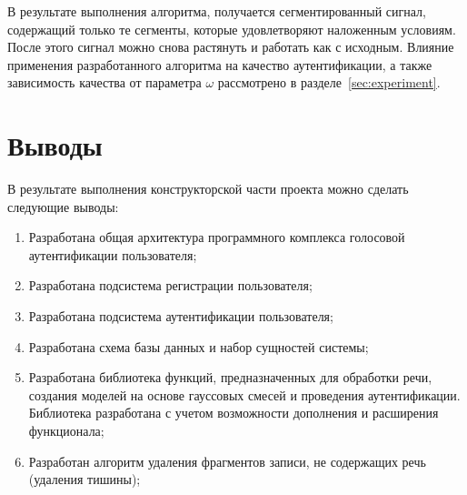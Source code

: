 В результате выполнения алгоритма, получается сегментированный сигнал, содержащий только те сегменты, которые удовлетворяют наложенным условиям. После этого сигнал можно снова растянуть и работать как с исходным. Влияние применения разработанного алгоритма на качество аутентификации, а также зависимость качества от параметра $\omega$ рассмотрено в разделе~\ref{sec:experiment}.

\section{Выводы}

В результате выполнения конструкторской части проекта можно сделать следующие выводы:
\begin{enumerate}
\item Разработана общая архитектура программного комплекса голосовой аутентификации пользователя;
\item Разработана подсистема регистрации пользователя;
\item Разработана подсистема аутентификации пользователя;
\item Разработана схема базы данных и набор сущностей системы;
\item Разработана библиотека функций, предназначенных для обработки речи, создания моделей на основе гауссовых смесей и проведения аутентификации. Библиотека разработана с учетом возможности дополнения и расширения функционала;
\item Разработан алгоритм удаления фрагментов записи, не содержащих речь (удаления тишины);
\end{enumerate}


